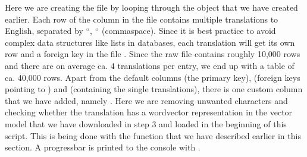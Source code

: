 \documentclass[letterpaper,10pt,english]{sphinxmanual}
\begin{document}
\sphinxAtStartPar
Here we are creating the file  by looping through the
 object that we have created earlier. Each row of the column
 in the file  contains multiple
translations to English, separated by “, “ (comma\sphinxhyphen{}space).
Since it is best practice to
avoid complex data structures like lists in databases, each translation
will get its own row and a foreign key in the file .
Since the raw file contains roughly 10,000 rows and there are on average ca. 4
translations per entry, we end up with a  table of ca.
40,000 rows.
Apart from the default columns  (the primary key), 
(foreign keys pointing to ) and 
(containing the single translations), there is one custom column that we
have added, namely . Here we are removing unwanted characters and
checking whether the translation has a word\sphinxhyphen{}vector representation in the
 vector model that we have
downloaded in step 3 and loaded in the beginning of this script. This is
being done with the  function that we have described
earlier in this section. A progressbar is printed to the console with
.
\end{document}
